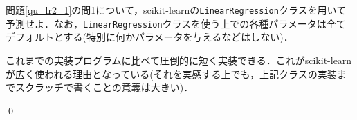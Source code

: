\begin{qu}
問題\ref{qu_lr2_1}の問1について，scikit-learnの\texttt{LinearRegression}クラスを用いて予測せよ．なお，\texttt{LinearRegression}クラスを使う上での各種パラメータは全てデフォルトとする(特別に何かパラメータを与えるなどはしない)．
\end{qu}
\begin{ans}
これまでの実装プログラムに比べて圧倒的に短く実装できる．これがscikit-learnが広く使われる理由となっている(それを実感する上でも，上記クラスの実装までスクラッチで書くことの意義は大きい)．
\begin{cod}[\texttt{lr15.py}]　
}]{code/lr15.py}
\vspace{-10pt}
\begin{lstlisting}
y_pred=411410.5372498779
\end{lstlisting}
\end{cod}
\vspace{-10pt}
\qed	
\end{ans}




